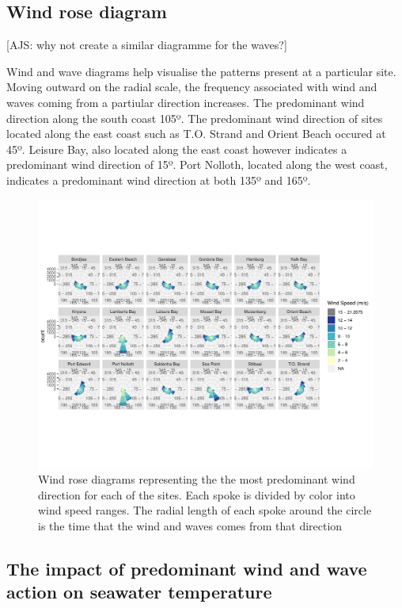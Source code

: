 \documentclass[12pt,A4paper,]{article}
\begin{document}
\subsection{Wind rose diagram}\label{wind-rose-diagram}

{[}AJS: why not create a similar diagramme for the waves?{]}

Wind and wave diagrams help visualise the patterns present at a
particular site. Moving outward on the radial scale, the frequency
associated with wind and waves coming from a partiular direction
increases. The predominant wind direction along the south coast 105º.
The predominant wind direction of sites located along the east coast
such as T.O. Strand and Orient Beach occured at 45º. Leisure Bay, also
located along the east coast however indicates a predominant wind
direction of 15º. Port Nolloth, located along the west coast, indicates
a predominant wind direction at both 135º and 165º.

\begin{figure}
\centering
\includegraphics{../figures/p.wr3.pdf}
\caption{Wind rose diagrams representing the the most predominant wind
direction for each of the sites. Each spoke is divided by color into
wind speed ranges. The radial length of each spoke around the circle is
the time that the wind and waves comes from that direction}
\end{figure}

\subsection{The impact of predominant wind and wave action on seawater
temperature}\label{the-impact-of-predominant-wind-and-wave-action-on-seawater-temperature}
\end{document}
